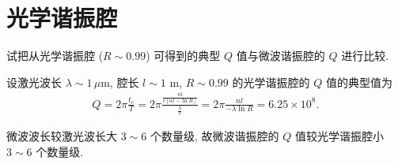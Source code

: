 \documentclass[twoside]{note}
\begin{document}
\fi
\setcounter{chapter}{6}
\chapter{光学谐振腔}
\begin{exe}
    试把从光学谐振腔 ($R\sim 0.99$) 可得到的典型 $Q$ 值与微波谐振腔的 $Q$ 进行比较.
\end{exe}
\begin{pf}
    设激光波长 $\lambda\sim 1\,\mu$m, 腔长 $l\sim 1$ m, $R\sim 0.99$ 的光学谐振腔的 $Q$ 值的典型值为
    \begin{align}
        Q=2\pi\frac{t_c}{T}=2\pi\frac{\frac{nl}{c[\alpha l-\ln R]}}{\frac{\lambda}{c}}=2\pi\frac{nl}{-\lambda\ln R}=6.25\times 10^8.
    \end{align}

    微波波长较激光波长大 $3\sim 6$ 个数量级, 故微波谐振腔的 $Q$ 值较光学谐振腔小 $3\sim 6$ 个数量级.
\end{pf}
\end{document}
